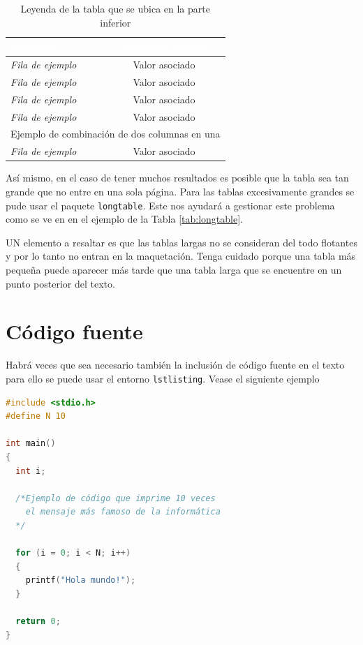 \begin{table}[hp!]
  \centering
  \begin{tabular}{l|c} %
  \rowcolor{ficblue!50}
  \textcolor{white}{\textbf{Cabecera}} & \textcolor{white}{\textbf{Cabecera Valores}} \\\hline
  \textit{Fila de ejemplo} & Valor asociado \\
  \textit{Fila de ejemplo} & Valor asociado \\
  \textit{Fila de ejemplo} & Valor asociado \\
  \textit{Fila de ejemplo} & Valor asociado \\
  \multicolumn{2}{c}{Ejemplo de combinación de dos columnas en una}\\
  \textit{Fila de ejemplo} & Valor asociado \\
  \end{tabular}
  \caption{Leyenda de la tabla que se ubica en la parte inferior}
  \label{tab:ejemplo}
\end{table}


Así mismo, en el caso de tener muchos resultados es posible que la tabla sea tan grande 
que no entre en una sola página. Para las tablas excesivamente grandes se pude usar 
el paquete \texttt{longtable}. Este nos ayudará a gestionar este problema como se ve en 
en el ejemplo de la Tabla \ref{tab:longtable}.



UN elemento a resaltar es que las tablas largas no se consideran del todo flotantes y por 
lo tanto no entran en la maquetación. Tenga cuidado porque una tabla más pequeña puede 
aparecer más tarde que una tabla larga que se encuentre en un punto posterior del texto.

\section{Código fuente}

Habrá veces que sea necesario también la inclusión de código fuente en el texto para 
ello se puede usar el entorno \texttt{lstlisting}. Vease el siguiente ejemplo

\begin{lstlisting}[language=C]
#include <stdio.h>
#define N 10

int main()
{
  int i;
  
  /*Ejemplo de código que imprime 10 veces 
    el mensaje más famoso de la informática
  */

  for (i = 0; i < N; i++)
  {
    printf("Hola mundo!");
  }

  return 0;
}
\end{lstlisting}

